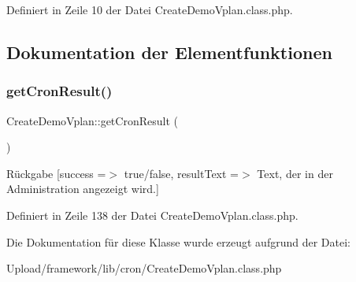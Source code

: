 Definiert in Zeile 10 der Datei Create\+Demo\+Vplan.\+class.\+php.



\subsection{Dokumentation der Elementfunktionen}
\mbox{\label{class_create_demo_vplan_a5aee66a7a529e1b727f60ce1d34583d6}} 
\subsubsection{\texorpdfstring{get\+Cron\+Result()}{getCronResult()}}
{\footnotesize\ttfamily Create\+Demo\+Vplan\+::get\+Cron\+Result (\begin{DoxyParamCaption}{ }\end{DoxyParamCaption})}

\begin{DoxyReturn}{Rückgabe}
\mbox{[}\textquotesingle{}success\textquotesingle{} =$>$ \textquotesingle{}true/false\textquotesingle{}, \textquotesingle{}result\+Text\textquotesingle{} =$>$ \textquotesingle{}Text, der in der Administration angezeigt wird.\textquotesingle{}\mbox{]} 
\end{DoxyReturn}


Definiert in Zeile 138 der Datei Create\+Demo\+Vplan.\+class.\+php.



Die Dokumentation für diese Klasse wurde erzeugt aufgrund der Datei\+:\begin{DoxyCompactItemize}
\item 
Upload/framework/lib/cron/Create\+Demo\+Vplan.\+class.\+php\end{DoxyCompactItemize}
